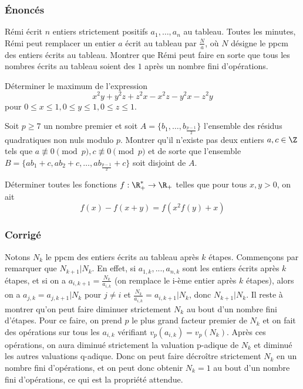\subsubsection{Énoncés}


\begin{exo}
Rémi écrit $n$ entiers strictement positifs $a_1,\ldots,a_n$ au tableau. Toutes les minutes, Rémi peut remplacer un entier $a$ écrit au tableau par $\frac{N}{a}$, où $N$ désigne le ppcm des entiers écrits au tableau. Montrer que Rémi peut faire en sorte que tous les nombres écrits au tableau soient des $1$ après un nombre fini d'opérations.
\end{exo}


\begin{exo}
Déterminer le maximum de l'expression
$$x^2y + y^2z + z^2x - x^2z - y^2x - z^2y$$
pour $0\leq x\leq 1, 0\leq y\leq 1, 0\leq z \leq 1$.
\end{exo}


\begin{exo}
Soit $p\geq 7$ un nombre premier et soit $A = \{b_1, \dots, b_{\frac{p-1}{2}}\}$ l'ensemble des résidus quadratiques non nuls modulo $p$. Montrer qu'il n'existe pas deux entiers $a, c\in \Z$ tels que $a \not\equiv 0\pmod p, c\not \equiv 0 \pmod p$ et de sorte que l'ensemble $B=\{ab_1+c,ab_2+c,\ldots,ab_{\frac{p-1}{2}}+c\}$ soit disjoint de $A$. 
\end{exo}

\begin{exo}
Déterminer toutes les fonctions $f : \R_+^* \rightarrow \R_+$ telles que pour tous $x,y>0$, on ait
$$f(x) - f(x + y) = f(x^2f(y) + x)$$
\end{exo}


\subsubsection{Corrigé}


\begin{sol}
Notons $N_k$ le ppcm des entiers écrits au tableau après $k$ étapes. Commençons par remarquer que $N_{k+1}|N_k$. En effet, si $a_{1,k},...,a_{n,k}$ sont les entiers écrits après $k$ étapes, et si on a $a_{i,k+1}=\frac{N_k}{a_{i,k}}$ (on remplace le i-ème entier après $k$ étapes), alors on a $a_{j,k}=a_{j,k+1}|N_k$ pour $j\ne i$ et $\frac{N_k}{a_{i,k}}=a_{i,k+1}|N_k$, donc $N_{k+1}|N_k$. Il reste à montrer qu'on peut faire diminuer strictement $N_k$ au bout d'un nombre fini d'étapes. Pour ce faire, on prend $p$ le plus grand facteur premier de $N_k$ et on fait des opérations sur tous les $a_{i,k}$ vérifiant $v_p(a_{i,k})=v_p(N_k)$. Après ces opérations, on aura diminué strictement la valuation p-adique de $N_k$ et diminué les autres valuations q-adique. Donc on peut faire décroître strictement $N_k$ en un nombre fini d'opérations, et on peut donc obtenir $N_k=1$ au bout d'un nombre fini d'opérations, ce qui est la propriété attendue.
\end{sol}


